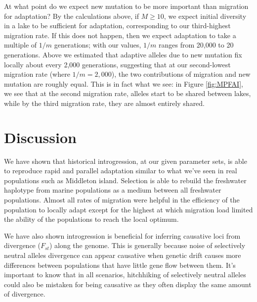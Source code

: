 \documentclass{article}
\begin{document}
At what point do we expect new mutation to be more important than migration for adaptation?
By the calculations above, if $M \ge 10$, we expect initial diversity in a lake to be sufficient 
for adaptation, corresponding to our third-highest migration rate.
If this does not happen, then we expect adaptation to take a multiple of $1/m$ generations;
with our values, $1/m$ ranges from 20,000 to 20 generations.
Above we estimated that adaptive alleles due to new mutation fix locally about every 2,000 generations,
suggesting that at our second-lowest migration rate (where $1/m = 2,000$),
the two contributions of migration and new mutation are roughly equal.
This is in fact what we see: in Figure \ref{fig:MPFAI},
we see that at the second migration rate, alleles start to be shared between lakes,
while by the third migration rate, they are almost entirely shared.


\section{Discussion}

We have shown that historical introgression, at our given parameter sets,
is able to reproduce rapid and parallel adaptation similar to what we've seen in real populations such as Middleton island.
Selection is able to rebuild the freshwater haplotype from marine populations as a medium between all freshwater populations.
Almost all rates of migration were helpful in the efficiency of the population to locally adapt except for the highest at which migration load 
limited the ability of the populations to reach the local optimum. 

We have also shown introgression is beneficial for inferring causative loci from divergence ($F_{st}$) along the genome. 
This is generally because noise of selectively neutral alleles divergence can appear causative when genetic drift causes more 
differences between populations that have little gene flow between them.
It's important to know that in all scenarios, hitchhiking of selectively neutral alleles could also be 
mistaken for being causative as they often display the same amount of divergence.

\end{document}
